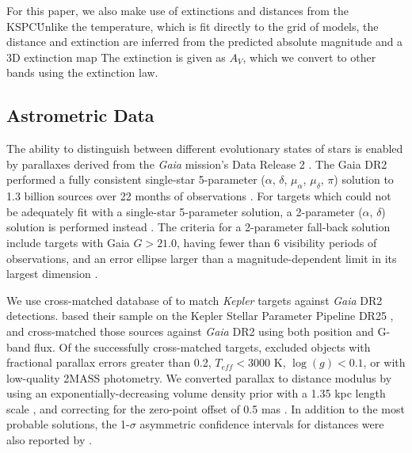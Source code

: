 \documentclass[manuscript]{aastex6}
\newcommand{\Kepler}{\mbox{\textit{Kepler}}}
\newcommand{\Gaia}{\mbox{\textit{Gaia}}}
\newcommand{\Teff}{\ensuremath{T_{eff}}}
\newcommand{\logg}{\ensuremath{\log(g)}}
\newcommand{\gvs}{\authorcomment1}
\begin{document}
For this paper, we also make use of extinctions and distances from the KSPC\.
Unlike the temperature, which is fit directly to the grid of models, the
distance and extinction are inferred from the predicted absolute magnitude and
a 3D extinction map \citep{Amores05} The extinction is given as \(A_V\), which we
convert to other bands using the \citep{Cardelli89} extinction law.

\subsection{Astrometric Data}

The ability to distinguish between different evolutionary states of stars is
enabled by parallaxes derived from the \Gaia{} mission's Data Release 2
\citep{Gaia18}. The Gaia DR2 performed a fully consistent single-star
5-parameter (\(\alpha\), \(\delta\), \(\mu_\alpha\), \(\mu_\delta\), \(\pi\))
solution to 1.3 billion sources over 22 months of observations
\citep{Lindegren18}. For targets which could not be adequately fit with a
single-star 5-parameter solution, a 2-parameter (\(\alpha\), \(\delta\))
solution is performed instead \citep{Michalik15}. The criteria for a
2-parameter fall-back solution include targets with Gaia \(G > 21.0\), having
fewer than 6 visibility periods of observations, and an error ellipse larger
than a magnitude-dependent limit in its largest dimension \citep{Lindegren18}.


We use  cross-matched database of \citet{Berger18b} to match \Kepler{} targets
against \Gaia{} DR2 detections.
\citet{Berger18b} based their sample on the Kepler Stellar Parameter Pipeline
DR25 \citep{Mathur17}, and cross-matched those sources against \Gaia{} DR2
using both position and G-band flux. Of the successfully cross-matched targets,
\citet{Berger18b} excluded objects with fractional parallax errors greater than
0.2, \(\Teff < 3000\) K, \(\logg < 0.1\), or with low-quality 2MASS photometry. 
We converted parallax to distance modulus by using an
exponentially-decreasing volume density prior with a 1.35 kpc length scale
\citep{BailerJones15,Astraatmadja16}, and correcting for the zero-point offset
of 0.5 mas \citep{Zinn18}. \gvs{Should we include a table of this?} In 
addition to the most probable solutions, the 1-\(\sigma\) asymmetric 
confidence intervals for distances were also reported by \citet{Berger18b}.
\end{document}
